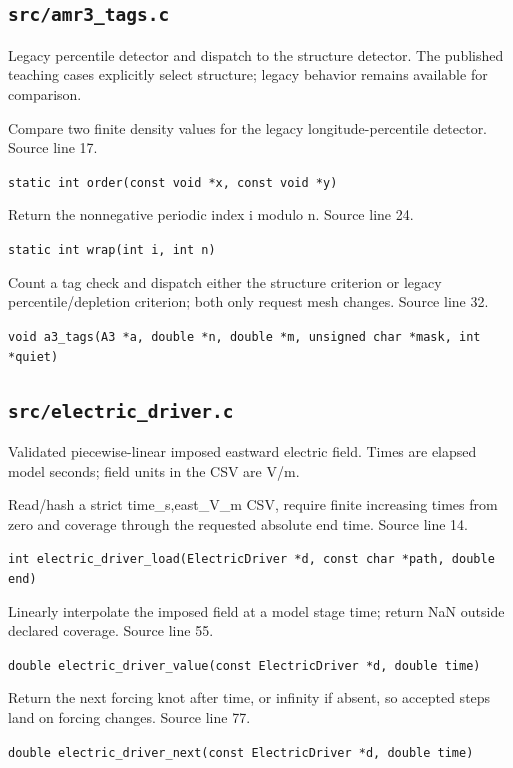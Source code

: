 \subsection{\texttt{src/amr3\_tags.c}}
Legacy percentile detector and dispatch to the structure detector. The published teaching cases explicitly select structure; legacy behavior remains available for comparison.
\begin{description}[style=nextline,leftmargin=0pt,labelindent=0pt,labelwidth=0pt,labelsep=0pt]
\item[\texttt{order}] Compare two finite density values for the legacy longitude-percentile detector. Source line 17.\par
{\small\nolinkurl{static int order(const void *x, const void *y)}}
\item[\texttt{wrap}] Return the nonnegative periodic index i modulo n. Source line 24.\par
{\small\nolinkurl{static int wrap(int i, int n)}}
\item[\texttt{a3\_tags}] Count a tag check and dispatch either the structure criterion or legacy percentile/depletion criterion; both only request mesh changes. Source line 32.\par
{\small\nolinkurl{void a3_tags(A3 *a, double *n, double *m, unsigned char *mask, int *quiet)}}
\end{description}
\subsection{\texttt{src/electric\_driver.c}}
Validated piecewise-linear imposed eastward electric field. Times are elapsed model seconds; field units in the CSV are V/m.
\begin{description}[style=nextline,leftmargin=0pt,labelindent=0pt,labelwidth=0pt,labelsep=0pt]
\item[\texttt{electric\_driver\_load}] Read/hash a strict time\_s,east\_V\_m CSV, require finite increasing times from zero and coverage through the requested absolute end time. Source line 14.\par
{\small\nolinkurl{int electric_driver_load(ElectricDriver *d, const char *path, double end)}}
\item[\texttt{electric\_driver\_value}] Linearly interpolate the imposed field at a model stage time; return NaN outside declared coverage. Source line 55.\par
{\small\nolinkurl{double electric_driver_value(const ElectricDriver *d, double time)}}
\item[\texttt{electric\_driver\_next}] Return the next forcing knot after time, or infinity if absent, so accepted steps land on forcing changes. Source line 77.\par
{\small\nolinkurl{double electric_driver_next(const ElectricDriver *d, double time)}}
\end{description}
